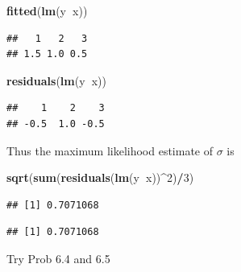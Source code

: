 \documentclass[]{book}
\newenvironment{Shaded}{\begin{snugshade}}{\end{snugshade}}
\newcommand{\KeywordTok}[1]{\textcolor[rgb]{0.13,0.29,0.53}{\textbf{#1}}}
\newcommand{\DecValTok}[1]{\textcolor[rgb]{0.00,0.00,0.81}{#1}}
\newcommand{\OperatorTok}[1]{\textcolor[rgb]{0.81,0.36,0.00}{\textbf{#1}}}
\newcommand{\NormalTok}[1]{#1}
\theoremstyle{definition}
\theoremstyle{definition}
\theoremstyle{definition}
\theoremstyle{remark}
\begin{document}
\begin{Shaded}
\begin{Highlighting}[]
\KeywordTok{fitted}\NormalTok{(}\KeywordTok{lm}\NormalTok{(y}\OperatorTok{~}\NormalTok{x))}
\end{Highlighting}
\end{Shaded}

\begin{verbatim}
##   1   2   3 
## 1.5 1.0 0.5
\end{verbatim}

\begin{Shaded}
\begin{Highlighting}[]
\KeywordTok{residuals}\NormalTok{(}\KeywordTok{lm}\NormalTok{(y}\OperatorTok{~}\NormalTok{x))}
\end{Highlighting}
\end{Shaded}

\begin{verbatim}
##    1    2    3 
## -0.5  1.0 -0.5
\end{verbatim}

Thus the maximum likelihood estimate of \(\sigma\) is

\begin{Shaded}
\begin{Highlighting}[]
\KeywordTok{sqrt}\NormalTok{(}\KeywordTok{sum}\NormalTok{(}\KeywordTok{residuals}\NormalTok{(}\KeywordTok{lm}\NormalTok{(y}\OperatorTok{~}\NormalTok{x))}\OperatorTok{^}\DecValTok{2}\NormalTok{)}\OperatorTok{/}\DecValTok{3}\NormalTok{)}
\end{Highlighting}
\end{Shaded}

\begin{verbatim}
## [1] 0.7071068
\end{verbatim}

\begin{Shaded}
\end{Shaded}

\begin{verbatim}
## [1] 0.7071068
\end{verbatim}

Try Prob 6.4 and 6.5
\end{document}
